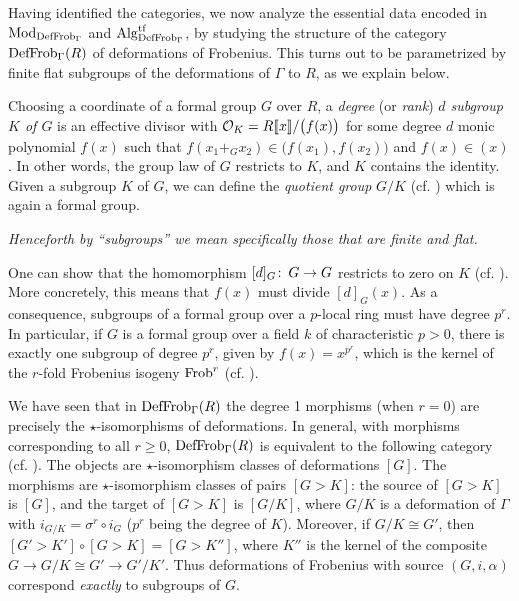 \documentclass{gtpart}
\theoremstyle{definition}
\theoremstyle{remark}
\def\co{\colon\thinspace}
\newcommand{\Mod}{{\rm Mod}}
\newcommand{\Alg}{{\rm Alg}}
\newcommand{\Frob}{{\rm Frob}}
\newcommand{\CO}{{\cal O}}
\newcommand{\DF}{{{\rm DefFrob}_\Gamma}}
\begin{document}
Having identified the categories, we now analyze the essential data 
encoded in $\Mod_\DF$ and $\Alg_\DF^{\rm tf}$, by studying the structure of the 
category $\DF(R)$ of deformations of Frobenius.  This turns out to be 
parametrized by finite flat subgroups of the deformations of $\Gamma$ to $R$, as we explain below.

Choosing a coordinate of a formal group $G$ over $R$, a {\em degree} (or 
{\em rank}) {\em $d$ subgroup $K$ of $G$} is an effective divisor with 
$\CO_K = R \llbracket x \rrbracket / \big(f(x)\big)$ for some degree $d$ 
monic polynomial $f(x)$ such that 
$f(x_1 +_G x_2) \in \big(f(x_1),f(x_2)\big)$ 
and $f(x) \in (x)$.  In other words, the group law of $G$ restricts to 
$K$, and $K$ contains the identity.  Given a subgroup $K$ 
of $G$, we can define the {\em quotient group} $G/K$ (cf. \cite[section 5]{strick}) which is again a formal group.  

{\em Henceforth by ``subgroups'' we 
mean specifically those that are finite and flat.}  

One can show that the homomorphism $[d]_G\co G \to G$ restricts to zero 
on $K$ (cf. \cite[section 1]{tateoort}).  More concretely, this means that $f(x)$ 
must divide $[d]_G(x)$.  As a consequence, subgroups of a formal group 
over a $p$-local ring must have degree $p^r$.  In particular, if $G$ is a 
formal group over a field $k$ of characteristic $p>0$, there is exactly 
one subgroup of degree $p^r$, given by $f(x) = x^{p^r}$, which is the 
kernel of the $r$-fold Frobenius isogeny $\Frob^r$ (cf. \cite[proposition 16.8]{lpo}).  

We have seen that in $\DF(R)$ the degree 1 morphisms (when $r = 0$) 
are precisely the $\star$-isomorphisms of deformations.  In general, with morphisms corresponding to all 
$r \geq 0$, $\DF(R)$ is 
equivalent to the following category (cf. \cite[proposition 16.9]{lpo}).  
The objects are $\star$-isomorphism classes of deformations $[G]$.  The 
morphisms are $\star$-isomorphism classes of pairs $[G > K]$: the source 
of $[G > K]$ is $[G]$, and the target of $[G > K]$ is $[G/K]$, where 
$G/K$ is a deformation of $\Gamma$ with $i_{G/K} = \sigma^r \circ i_G$ 
($p^r$ being the degree of $K$).  Moreover, if $G/K \cong G'$, then 
$[G' > K'] \circ [G > K] = [G > K'']$, where $K''$ is the kernel of the 
composite $G \to G/K \cong G' \to G'/K'$.  Thus deformations of Frobenius 
with source $(G,i,\alpha)$ correspond {\em exactly} to subgroups of $G$.  
\end{document}
